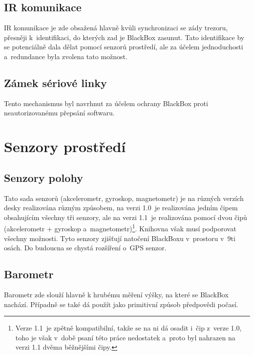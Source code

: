 \subsection{IR komunikace}
IR komunikace je zde obsažená hlavně kvůli synchronizaci se zády trezoru, přesněji k~identifikaci, do kterých zad je BlackBox zasunut.
Tato identifikace by se potenciálně dala dělat pomocí senzorů prostředí, ale za účelem jednoduchosti a~redundance byla zvolena tato možnost.

\subsection{Zámek sériové linky}
Tento mechanismus byl navrhnut za účelem ochrany BlackBox proti neautorizovanému přepsání softwaru.

\section{Senzory prostředí}

\subsection{Senzory polohy}
Tato sada senzorů (akcelerometr, gyroskop, magnetometr) je na různých verzích desky realizována různým způsobem, na verzi 1.0~je realizována jedním čipem obsahujícím všechny tři senzory, ale na verzi 1.1~je realizována pomocí dvou čipů (akcelerometr + gyroskop a~magnetometr)\footnote{Verze 1.1~je zpětně kompatibilní, takže se na ni dá osadit i~čip z~verze 1.0, toho je však v~době psaní této práce nedostatek a~proto byl nahrazen na verzi 1.1 dvěma běžnějšími čipy.}.
Knihovna však musí podporovat všechny možnosti.
Tyto senzory zjišťují natočení BlackBoxu v~prostoru v~9ti osách.
Do budoucna se chystá rozšíření o~GPS senzor.

\subsection{Barometr}
Barometr zde slouží hlavně k hrubému měření výšky, na které se BlackBox nachází.
Případně se také dá použít jako primitivní způsob předpovědi počasí.
